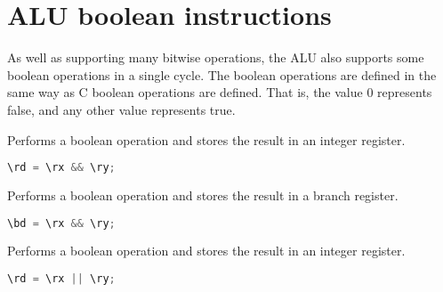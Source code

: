 
\section{ALU boolean instructions}


As well as supporting many bitwise operations, the \rvex{} ALU also supports
some boolean operations in a single cycle. The boolean operations are defined in
the same way as C boolean operations are defined. That is, the value 0
represents false, and any other value represents true.

Performs a boolean  operation and stores the result in an integer
register.

\begin{lstlisting}[numbers=none, basicstyle=\ttfamily\footnotesize, language=C++]
\rd = \rx && \ry;
\end{lstlisting}

Performs a boolean  operation and stores the result in a branch
register.

\begin{lstlisting}[numbers=none, basicstyle=\ttfamily\footnotesize, language=C++]
\bd = \rx && \ry;
\end{lstlisting}

Performs a boolean  operation and stores the result in an integer
register.

\begin{lstlisting}[numbers=none, basicstyle=\ttfamily\footnotesize, language=C++]
\rd = \rx || \ry;
\end{lstlisting}

